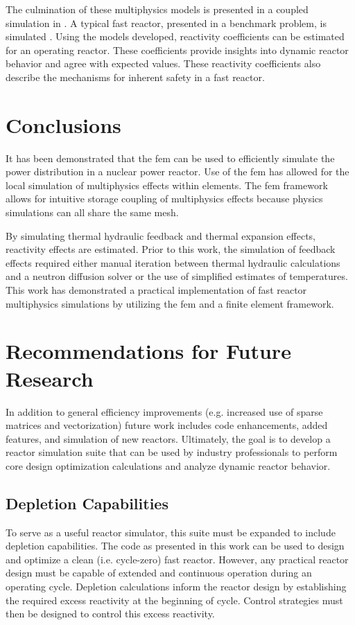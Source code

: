   The culmination of these multiphysics models is presented in a coupled
  simulation in . A typical fast reactor, presented in 
  a benchmark problem, is simulated \cite{abr}. Using the models developed, 
  reactivity coefficients can be estimated for an operating reactor. These 
  coefficients provide insights into dynamic reactor behavior and agree with 
  expected values. These reactivity coefficients also describe the mechanisms 
  for inherent safety in a fast reactor.

\section{Conclusions}
  
  It has been demonstrated that the \gls{fem} can be used to efficiently 
  simulate the power distribution in a nuclear power reactor. Use of the
  \gls{fem} has allowed for the local simulation of multiphysics effects within 
  elements. The \gls{fem} framework allows for intuitive storage coupling of
  multiphysics effects because physics simulations can all share the same mesh.

  By simulating thermal hydraulic feedback and thermal expansion 
  effects, reactivity effects are estimated. Prior to this work, the 
  simulation of feedback effects required either manual iteration between 
  thermal hydraulic calculations and a neutron diffusion solver or the use of 
  simplified estimates of temperatures. This work has demonstrated a practical
  implementation of fast reactor multiphysics simulations by utilizing the
  \gls{fem} and a finite element framework.
  
\section{Recommendations for Future Research}

  In addition to general efficiency improvements (e.g. increased use of sparse
  matrices and vectorization) future work includes code enhancements, added 
  features, and simulation of new reactors. Ultimately, the goal is to develop a
  reactor simulation suite that can be used by industry professionals to perform 
  core design optimization calculations and analyze dynamic reactor behavior. 

  \subsection{Depletion Capabilities}
    To serve as a useful reactor simulator, this suite must be expanded to 
    include depletion capabilities. The code as presented in this work can be 
    used to design and optimize a clean (i.e. cycle-zero) fast reactor. However,
    any practical reactor design must be capable of extended and continuous 
    operation during an operating cycle. Depletion calculations inform the 
    reactor design by establishing the required excess reactivity at the 
    beginning of cycle.  Control strategies must then be designed to control 
    this excess reactivity. 

